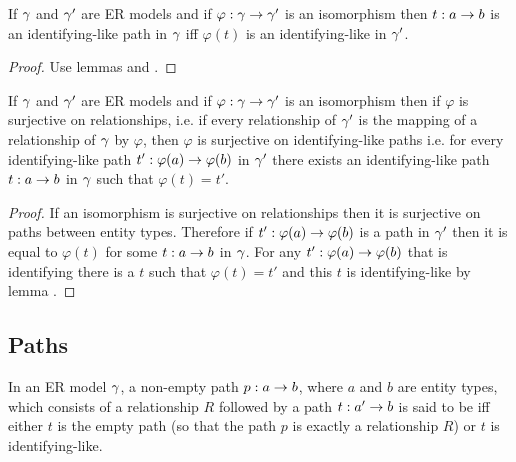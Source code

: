 \begin{lemma}
If $\gamma$ and $\gamma'$ are ER models and if $\varphi:\gamma \rightarrow \gamma'$ is an isomorphism then $t: a  \rightarrow  b$ is an identifying-like path in $\gamma$ iff $\varphi(t)$ is an identifying-like in $\gamma'$.
\end{lemma}
\begin{proof}
Use lemmas  and .
\end{proof}

\begin{lemma}
If $\gamma$ and $\gamma'$ are ER models and if $\varphi:\gamma \rightarrow \gamma'$ is an isomorphism then if $\varphi$ is 
surjective on relationships, i.e. if every relationship of $\gamma'$ is the mapping of a relationship of $\gamma$ by  $\varphi$,
then $\varphi$ is surjective on identifying-like paths i.e. for every identifying-like path $t': \varphi(a) \rightarrow \varphi(b)$
in $\gamma'$ there exists an identifying-like path $t: a \rightarrow b$ in $\gamma$ such that $\varphi(t)=t'$. 
\end{lemma}
\begin{proof}
If an isomorphism is surjective on relationships then it is surjective on paths between entity types.
Therefore if $t':\varphi(a) \rightarrow \varphi(b)$ is a path in $\gamma'$ then it is equal to $\varphi(t)$ for some
$t: a \rightarrow b$ in $\gamma$. For any $t':\varphi(a) \rightarrow \varphi(b)$ that is identifying there is a $t$ such that 
$\varphi(t)=t'$ and this $t$ is identifying-like by lemma .  
\end{proof}
\subsection{ Paths}
\begin{definition}
In an ER model $\gamma$, a non-empty path $p: a \rightarrow b$, where $a$ and $b$ are entity types, which consists
of a relationship $R$ followed by a  path $t :a' \rightarrow b$ is said to be  iff
either  $t$ is the empty path (so that the path $p$ is exactly a relationship $R$) or $t$
is identifying-like.
\end{definition}

